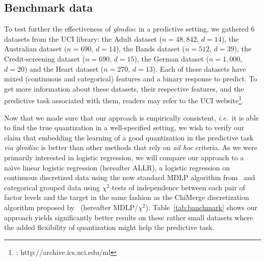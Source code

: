 \subsection{Benchmark data}

To test further the effectiveness of \textit{glmdisc} in a predictive setting, we gathered 6 datasets from the UCI library: the Adult dataset ($n=48,842$, $d=14$), the Australian dataset ($n=690$, $d=14$), the Bands dataset ($n=512$, $d=39$), the Credit-screening dataset ($n=690$, $d=15$), the German dataset ($n=1,000$, $d=20$) and the Heart dataset ($n=270$, $d=13$). Each of these datasets have mixed (continuous and categorical) features and a binary response to predict. To get more information about these datasets, their respective features, and the predictive task associated with them, readers may refer to the UCI website\footnote{\cite{Dua:2017} : http://archive.ics.uci.edu/ml}.

Now that we made sure that our approach is empirically consistent, \textit{i.e.}\ it is able to find the true quantization in a well-specified setting, we wish to verify our claim that embedding the learning of a good quantization in the predictive task \textit{via glmdisc} is better than other methods that rely on \textit{ad hoc} criteria. As we were primarily interested in logistic regression, we will compare our approach to a na\"{\i}ve linear logistic regression (hereafter ALLR), a logistic regression on continuous discretized data using the now standard MDLP algorithm from~\cite{fayyad1993multi} and categorical grouped data using $\chi^2$ tests of independence between each pair of factor levels and the target in the same fashion as the ChiMerge discretization algorithm proposed by~\cite{kerber1992chimerge} (hereafter MDLP/$\chi^2$). Table~\ref{tab:banchmark} shows our approach yields significantly better results on these rather small datasets where the added flexibility of quantization might help the predictive task.

